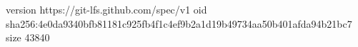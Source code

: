 version https://git-lfs.github.com/spec/v1
oid sha256:4e0da9340bfb81181c925fb4f1c4ef9b2a1d19b49734aa50b401afda94b21bc7
size 43840
